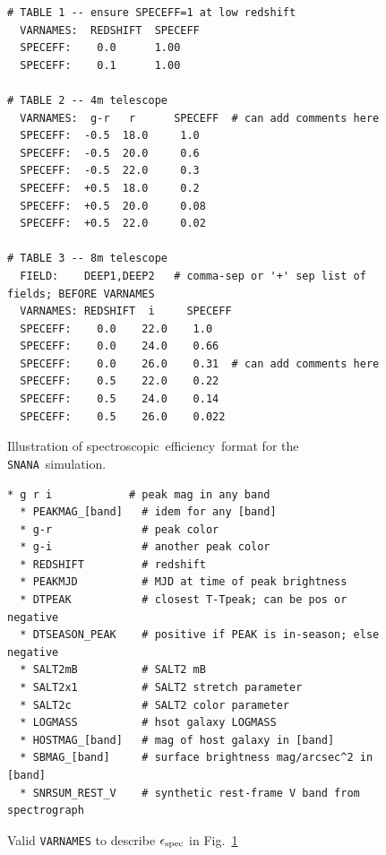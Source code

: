 \documentclass[12pt]{article}
\newcommand{\snana}{{\tt SNANA}}
\newcommand{\eff}{efficiency}
\newcommand{\simeffspec}{\epsilon_{\rm spec}}
\newcommand{\spec}{spectroscopic}
\begin{document}
{%
\begin{figure}[hb] 
\begin{center}
\caption{Illustration of \spec\ \eff\ format for the \snana\ simulation.}
\label{fig:speceff}
\begin{Verbatim}[frame=single]
# TABLE 1 -- ensure SPECEFF=1 at low redshift
  VARNAMES:  REDSHIFT  SPECEFF
  SPECEFF:    0.0      1.00
  SPECEFF:    0.1      1.00

# TABLE 2 -- 4m telescope
  VARNAMES:  g-r   r      SPECEFF  # can add comments here
  SPECEFF:  -0.5  18.0     1.0
  SPECEFF:  -0.5  20.0     0.6
  SPECEFF:  -0.5  22.0     0.3
  SPECEFF:  +0.5  18.0     0.2
  SPECEFF:  +0.5  20.0     0.08
  SPECEFF:  +0.5  22.0     0.02

# TABLE 3 -- 8m telescope
  FIELD:    DEEP1,DEEP2   # comma-sep or '+' sep list of fields; BEFORE VARNAMES
  VARNAMES: REDSHIFT  i     SPECEFF  
  SPECEFF:    0.0    22.0    1.0
  SPECEFF:    0.0    24.0    0.66
  SPECEFF:    0.0    26.0    0.31  # can add comments here
  SPECEFF:    0.5    22.0    0.22
  SPECEFF:    0.5    24.0    0.14
  SPECEFF:    0.5    26.0    0.022
\end{Verbatim} 
\end{center} 
\end{figure}


\begin{figure}[hb] 
\begin{center}
\caption{ Valid {\tt VARNAMES} to describe $\simeffspec$ in Fig.~\ref{fig:speceff} }
\label{fig:speceff_varnames}
\begin{Verbatim}[frame=single]
  * g r i            # peak mag in any band
  * PEAKMAG_[band]   # idem for any [band]
  * g-r              # peak color
  * g-i              # another peak color
  * REDSHIFT         # redshift
  * PEAKMJD          # MJD at time of peak brightness
  * DTPEAK           # closest T-Tpeak; can be pos or negative
  * DTSEASON_PEAK    # positive if PEAK is in-season; else negative
  * SALT2mB          # SALT2 mB 
  * SALT2x1          # SALT2 stretch parameter
  * SALT2c           # SALT2 color parameter
  * LOGMASS          # hsot galaxy LOGMASS
  * HOSTMAG_[band]   # mag of host galaxy in [band]
  * SBMAG_[band]     # surface brightness mag/arcsec^2 in [band]
  * SNRSUM_REST_V    # synthetic rest-frame V band from spectrograph
\end{Verbatim}
\end{center}
\end{figure}


}
\end{document}
